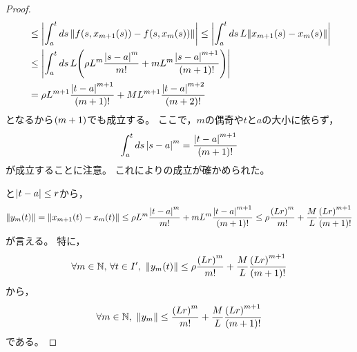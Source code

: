\documentclass[b5paper,draft,oneside,openany]{ltjsbook} %
\begin{document}
\begin{thm}[Picardの定理]
\begin{proof}
\begin{align}
            &\leq \abs{\int_a^t ds\,\norm{\fun{f}{s,\fun{x_{m+1}}{s}}-\fun{f}{s,\fun{x_{m}}{s}}}}
            \leq \abs{\int_a^t ds\,L\norm{\fun{x_{m+1}}{s}-\fun{x_m}{s}}}
            \\
            &\leq \abs{\int_a^t ds\, L\pare{\rho L^m\frac{\abs{s-a}^m}{m!}+mL^m\frac{\abs{s-a}^{m+1}}{\pare{m+1}!}}}
            \\
            &=\rho L^{m+1}\frac{\abs{t-a}^{m+1}}{\pare{m+1}!}
            +ML^{m+1}\frac{\abs{t-a}^{m+2}}{\pare{m+2}!}
        \end{align}
        となるから$\pare{m+1}$でも成立する。
        ここで，$m$の偶奇や$t$と$a$の大小に依らず，
        \begin{equation}
            \int_a^t ds\,\abs{s-a}^m=\frac{\abs{t-a}^{m+1}}{\pare{m+1}!}
        \end{equation}
        が成立することに注意。
        これによりの成立が確かめられた。

        と$\abs{t-a}\leq r$から，
        \begin{equation}
            \norm{\fun{y_{m}}{t}}=\norm{\fun{x_{m+1}}{t}-\fun{x_{m}}{t}}\leq \rho L^m\frac{\abs{t-a}^m}{m!}+mL^m\frac{\abs{t-a}^{m+1}}{\pare{m+1}!}
            \leq \rho \frac{\pare{Lr}^m}{m!}+\frac{M}{L}\frac{\pare{Lr}^{m+1}}{\pare{m+1}!}
        \end{equation}
        が言える。
        特に，
        \begin{equation}
            \forall m\in\N,\, \forall t\in I',\ \norm{\fun{y_m}{t}}\leq \rho \frac{\pare{Lr}^m}{m!}+\frac{M}{L}\frac{\pare{Lr}^{m+1}}{\pare{m+1}!}
        \end{equation}
        から，
        \begin{equation}
            \forall m\in\N,\ \norm{y_m}\leq \frac{\pare{Lr}^m}{m!}+\frac{M}{L}\frac{\pare{Lr}^{m+1}}{\pare{m+1}!}
        \end{equation}
        である。


\end{proof}
\end{thm}
\end{document}
